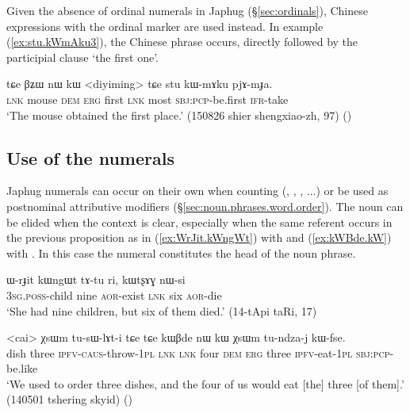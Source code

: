 Given the absence of ordinal numerals in Japhug (§\ref{sec:ordinals}), Chinese expressions with the ordinal marker   are used instead. In example (\ref{ex:stu.kWmAku3}), the Chinese phrase  occurs, directly followed by the participial clause  `the first one'.

\begin{exe}
	\ex  \label{ex:stu.kWmAku3}
	\gll tɕe βʑɯ nɯ kɯ <diyiming> tɕe stu kɯ-mɤku pjɤ-mɟa. \\
	\textsc{lnk} mouse \textsc{dem} \textsc{erg} first \textsc{lnk} most \textsc{sbj}:\textsc{pcp}-be.first \textsc{ifr}-take \\
	\glt `The mouse obtained the first place.' (150826 shier shengxiao-zh, 97)
()
\end{exe}

 \subsection{Use of the numerals}  \label{sec:uses.numerals}
 Japhug numerals can occur on their own when counting (, , , ...) or be used as postnominal attributive modifiers (§\ref{sec:noun.phrases.word.order}). The noun can be elided when the context is clear, especially when the same referent occurs in the previous proposition as in (\ref{ex:WrJit.kWngWt})  with  and (\ref{ex:kWBde.kW}) with . In this case the numeral constitutes the head of the noun phrase.

\begin{exe}
\ex \label{ex:WrJit.kWngWt} 
\gll ɯ-rɟit kɯngɯt tɤ-tu ri, kɯtʂɤɣ nɯ-si \\
\textsc{3sg}.\textsc{poss}-child nine \textsc{aor}-exist \textsc{lnk} six \textsc{aor}-die \\
\glt `She had nine children, but six of them died.' (14-tApi taRi, 17)
\end{exe}

\begin{exe}
\ex \label{ex:kWBde.kW} 
\gll <cai> χsɯm tu-sɯ-lɤt-i tɕe tɕe  kɯβde nɯ kɯ χsɯm tu-ndza-j kɯ-fse. \\
dish three \textsc{ipfv}-\textsc{caus}-throw-\textsc{1pl} \textsc{lnk} \textsc{lnk} four \textsc{dem} \textsc{erg} three \textsc{ipfv}-eat-\textsc{1pl} \textsc{sbj}:\textsc{pcp}-be.like \\
\glt `We used to order three dishes, and the four of us would eat [the] three [of them].' (140501 tshering skyid)
()
\end{exe}		

